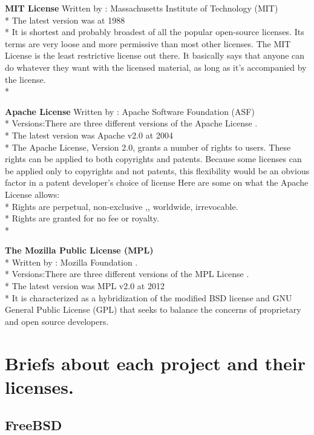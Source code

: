 \documentclass[11pt]{article} %
\begin{document}
{\bf MIT License}
Written by : Massachusetts Institute of Technology (MIT)\\* 
The latest version was at 1988\\* 
It is shortest and probably broadest of all the popular open-source licenses. Its terms are very loose and more permissive than most other licenses. The MIT License is the least restrictive license out there. It basically says that anyone can do whatever they want with the licensed material, as long as it’s accompanied by the license.\\* 

{\bf  Apache License}
Written by : Apache Software Foundation (ASF) \\* 
Versions:There are three different versions of the Apache License .\\* 
The latest version was Apache v2.0 at 2004\\* 
The Apache License, Version 2.0, grants a number of rights to users. These rights can be applied to both copyrights and patents. 
Because some licenses can be applied only to copyrights and not patents, this flexibility would be an obvious factor in a patent developer’s choice of license
Here are some on what the Apache License allows:\\* 
Rights are perpetual, non-exclusive ,, worldwide, irrevocable.\\* 
Rights are granted for no fee or royalty.\\* 

{\bf The Mozilla Public License (MPL)}\\* 
Written by : Mozilla Foundation .\\* 
Versions:There are three different versions of the MPL License .\\* 
The latest version was MPL v2.0 at 2012\\* 
It is characterized as a hybridization of the modified BSD license and GNU General Public License (GPL) that seeks to balance the concerns of proprietary and open source developers.

\section{Briefs about each project and their licenses.}
\subsection{FreeBSD} %
\end{document}

